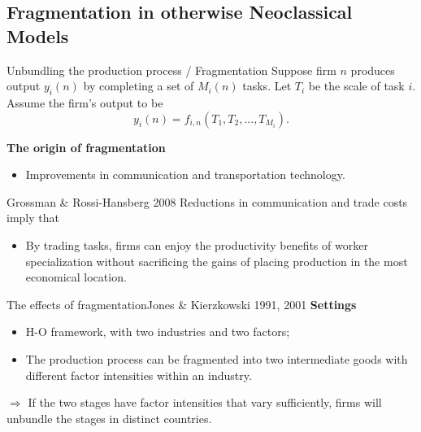 \documentclass{beamer}
\begin{document}
\subsection{Fragmentation in otherwise Neoclassical Models}
\begin{frame}[shrink]
	\transfade %
	\tableofcontents[sectionstyle=show/shaded,subsectionstyle=show/shaded/hide]
	\addtocounter{framenumber}{-1}
\end{frame}
\begin{frame}{Unbundling the production process / Fragmentation}
	Suppose firm $n$ produces output $y_i(n)$ by completing a set of $M_i(n)$ tasks. Let $T_i$ be the scale of task $i$. Assume the firm's output to be
	\begin{equation}
		y_i(n)=f_{i,n}(T_1,T_2,...,T_{M_i}).
	\end{equation}
	\medskip
	
	\textbf{The origin of fragmentation}
	\begin{itemize}
		\item Improvements in communication and transportation technology.
	\end{itemize}
	\medskip
	\begin{block}{Grossman \& Rossi-Hansberg 2008}
		Reductions in communication and trade costs imply that
		\begin{itemize}
			\item By trading tasks, firms can enjoy the productivity benefits of worker specialization without sacrificing the gains of placing production in the most economical location.
		\end{itemize}
	\end{block}
\end{frame}
\begin{frame}{The effects of fragmentation}{Jones \& Kierzkowski 1991, 2001}
	\textbf{Settings}
	\begin{itemize}
		\item H-O framework, with two industries and two factors;
		\item The production process can be fragmented into two intermediate goods with different factor intensities within an industry.
	\end{itemize}
	\medskip
	$\Rightarrow$ If the two stages have factor intensities that vary sufficiently, firms will unbundle the stages in distinct countries.
	\medskip
	\begin{block}{}
	\end{block}
	\begin{block}{}
	\end{block}
\end{frame}
\end{document}
